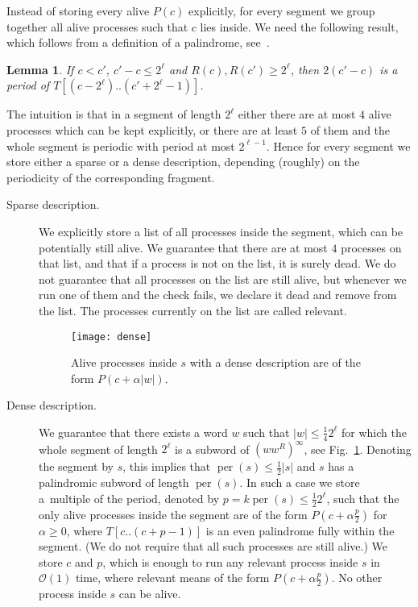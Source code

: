 \documentclass{article}[11pt,letter]
\newtheorem{lemma}[definition]{Lemma}
\newcommand{\bigo}{\mathcal{O}}
\DeclareMathOperator{\per}{per}
\newcommand{\kpers}{\ensuremath{p}}
\begin{document}
Instead of storing every alive $P(c)$ explicitly, for every segment we group together all alive processes such that $c$ lies inside.
We need the following result, which follows from a definition of a palindrome, see~\cite{Apostolico}.

\begin{lemma}
\label{lemma:periodicity}
If $c<c'$, $c'-c\leq 2^{\ell}$ and $R(c),R(c')\geq 2^{\ell}$, then $2(c'-c)$ is a period of $T[(c-2^{\ell})..(c'+2^{\ell}-1)]$.
\end{lemma}

The intuition is that in a segment of length $2^{\ell}$ either there are at most $4$ alive processes which can be kept explicitly,
or there are at least $5$ of them and the whole segment is periodic with period at 
most $2^{\ell-1}$. Hence for every segment we store either a sparse or a dense description, depending (roughly) on the periodicity of
the corresponding fragment.

\begin{description}
\item[Sparse description.] We explicitly store a list of all processes inside the segment, which can be potentially still alive.
We guarantee that there are at most $4$ processes on that list, and that if a process is not on the list, it is surely dead. We do not guarantee
that all processes on the list are still alive, but whenever we run one of them and the check fails, we declare it dead and remove from the list.
The processes currently on the list are called relevant.

\begin{figure}[t]
\texttt{[image: dense]}
\caption{Alive processes inside $s$ with a dense description are of the form $P(c+\alpha|w|)$.}
\label{fig:dense}
\end{figure}

\item[Dense description.] We guarantee that there exists a word $w$ such that $|w|\leq\frac{1}{4} 2^{\ell}$ for which the whole segment 
of length $2^{\ell}$
is a subword of $(ww^{R})^{\infty}$, see Fig.~\ref{fig:dense}. Denoting the segment by $s$, this implies that $\per(s)\leq\frac{1}{2}|s|$
and $s$ has a palindromic subword of length $\per(s)$. In such a case we store a~multiple of the period, denoted by $\kpers = k \per(s) \leq\frac{1}{2}2^{\ell}$,
such that the only alive processes inside the segment are of the form $P(c+\alpha \frac{\kpers}{2})$ for $\alpha\geq 0$, where $T[c..(c+\kpers-1)]$ is an even palindrome fully within the segment.
(We do not require that all such processes are still alive.) We store $c$ and $\kpers$, which is enough to run any relevant process
inside $s$ in $\bigo(1)$ time, where relevant means of the form $P(c+\alpha\frac{\kpers}{2})$.
No other process inside $s$ can be alive.
\end{description}
\end{document}
